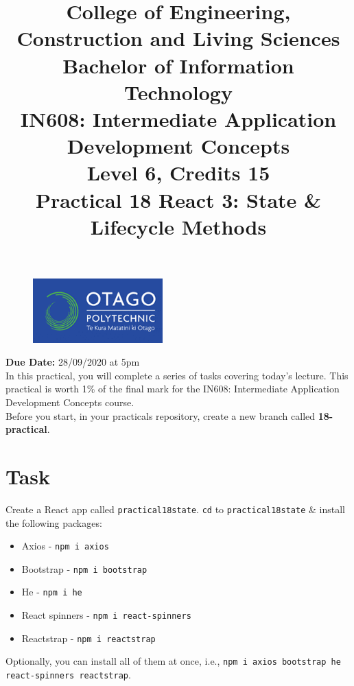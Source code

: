 \documentclass{article}
\author{}
\begin{document}
\begin{figure}
	\centering
	\includegraphics[width=50mm]{./img/logo.png}
\end{figure}

\title{College of Engineering, Construction and Living Sciences\\Bachelor of Information Technology\\IN608: Intermediate Application Development Concepts\\Level 6, Credits 15\\\textbf{Practical 18 React 3: State \& Lifecycle Methods}} 
\date{}
\maketitle

\textbf{Due Date:} 28/09/2020 at 5pm \\

In this practical, you will complete a series of tasks covering today's lecture. This practical is worth 1\% of the final mark for the IN608: Intermediate Application Development Concepts course. \\

Before you start, in your practicals repository, create a new branch called \textbf{18-practical}.

\section*{Task} 
Create a React app called \texttt{practical18state}. \texttt{cd} to \texttt{practical18state} \& install the following packages:
\begin{itemize}
  \item Axios - \texttt{npm i axios}
  \item Bootstrap - \texttt{npm i bootstrap}
  \item He - \texttt{npm i he}
  \item React spinners - \texttt{npm i react-spinners}
  \item Reactstrap - \texttt{npm i reactstrap}
\end{itemize}

Optionally, you can install all of them at once, i.e., \texttt{npm i axios bootstrap he react-spinners reactstrap}. \\
\end{document}
